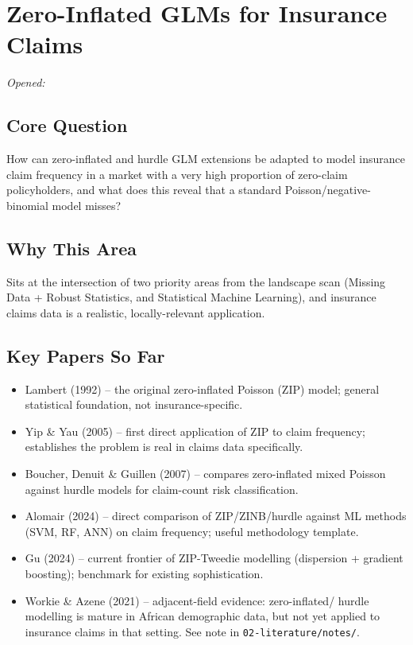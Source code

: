 \section{Zero-Inflated GLMs for Insurance Claims}
 \hfill \textit{Opened: }

\subsection*{Core Question}
How can zero-inflated and hurdle GLM extensions be adapted to model
insurance claim frequency in a market with a very high proportion of
zero-claim policyholders, and what does this reveal that a standard
Poisson/negative-binomial model misses?

\subsection*{Why This Area}
Sits at the intersection of two priority areas from the landscape scan
(Missing Data + Robust Statistics, and Statistical Machine Learning), and
insurance claims data is a realistic, locally-relevant application.

\subsection*{Key Papers So Far}
\begin{itemize}
\item Lambert (1992) -- the original zero-inflated Poisson (ZIP) model;
general statistical foundation, not insurance-specific.
\item Yip \& Yau (2005) -- first direct application of ZIP to claim
frequency; establishes the problem is real in claims data specifically.
\item Boucher, Denuit \& Guillen (2007) -- compares zero-inflated mixed
Poisson against hurdle models for claim-count risk classification.
\item Alomair (2024) -- direct comparison of ZIP/ZINB/hurdle against
ML methods (SVM, RF, ANN) on claim frequency; useful methodology
template.
\item Gu (2024) -- current frontier of ZIP-Tweedie modelling
(dispersion + gradient boosting); benchmark for existing sophistication.
\item Workie \& Azene (2021) -- adjacent-field evidence: zero-inflated/
hurdle modelling is mature in African demographic data, but not yet
applied to insurance claims in that setting. See note in
\texttt{02-literature/notes/}.
\end{itemize}

